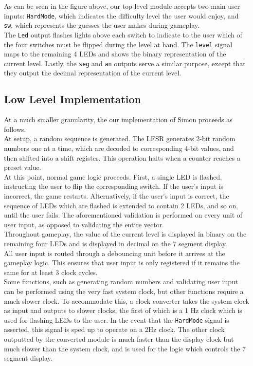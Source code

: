 \documentclass[]{article}
\begin{document}
As can be seen in the figure above, our top-level module accepts two main user inputs: \texttt{HardMode}, which indicates the difficulty level the user would enjoy, and \texttt{sw}, which represents the guesses the user makes during gameplay.\\

The \texttt{Led} output flashes lights above each switch to indicate to the user which of the four switches must be flipped during the level at hand. The \texttt{level} signal maps to the remaining 4 LEDs and shows the binary representation of the current level. Lastly, the \texttt{seg} and \texttt{an} outputs serve a similar purpose, except that they output the decimal representation of the current level.

\subsection{Low Level Implementation}
At a much smaller granularity, the our implementation of Simon proceeds as follows.\\

At setup, a random sequence is generated. The LFSR generates 2-bit random numbers one at a time, which are decoded to corresponding 4-bit values, and then shifted into a shift register. This operation halts when a counter reaches a preset value.\\

At this point, normal game logic proceeds. First, a single LED is flashed, instructing the user to flip the corresponding switch. If the user's input is incorrect, the game restarts. Alternatively, if the user's input is correct, the sequence of LEDs which are flashed is extended to contain 2 LEDs, and so on, until the user fails. The aforementioned validation is performed on every unit of user input, as opposed to validating the entire vector.\\

Throughout gameplay, the value of the current level is displayed in binary on the remaining four LEDs and is displayed in decimal on the 7 segment display.\\

All user input is routed through a debouncing unit before it arrives at the gameplay logic. This ensures that user input is only registered if it remains the same for at least 3 clock cycles.\\

Some functions, such as generating random numbers and validating user input can be performed using the very fast system clock, but other functions require a much slower clock. To accommodate this, a clock converter takes the system clock as input and outputs to slower clocks, the first of which is a 1 Hz clock which is used for flashing LEDs to the user. In the event that the \texttt{HardMode} signal is asserted, this signal is sped up to operate on a 2Hz clock. The other clock outputted by the converted module is much faster than the display clock but much slower than the system clock, and is used for the logic which controls the 7 segment display.
\end{document}
